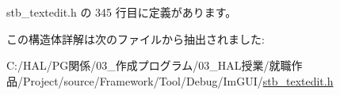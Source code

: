  stb\+\_\+textedit.\+h の 345 行目に定義があります。



この構造体詳解は次のファイルから抽出されました\+:\begin{DoxyCompactItemize}
\item 
C\+:/\+H\+A\+L/\+P\+G関係/03\+\_\+作成プログラム/03\+\_\+\+H\+A\+L授業/就職作品/\+Project/source/\+Framework/\+Tool/\+Debug/\+Im\+G\+U\+I/\mbox{\hyperlink{stb__textedit_8h}{stb\+\_\+textedit.\+h}}\end{DoxyCompactItemize}
